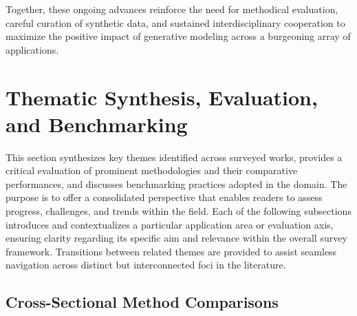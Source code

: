 \documentclass[sigconf]{acmart}
\begin{document}
Together, these ongoing advances reinforce the need for methodical evaluation, careful curation of synthetic data, and sustained interdisciplinary cooperation to maximize the positive impact of generative modeling across a burgeoning array of applications.

\section{Thematic Synthesis, Evaluation, and Benchmarking}

This section synthesizes key themes identified across surveyed works, provides a critical evaluation of prominent methodologies and their comparative performances, and discusses benchmarking practices adopted in the domain. The purpose is to offer a consolidated perspective that enables readers to assess progress, challenges, and trends within the field. Each of the following subsections introduces and contextualizes a particular application area or evaluation axis, ensuring clarity regarding its specific aim and relevance within the overall survey framework. Transitions between related themes are provided to assist seamless navigation across distinct but interconnected foci in the literature.

\subsection{Cross-Sectional Method Comparisons}
\end{document}
